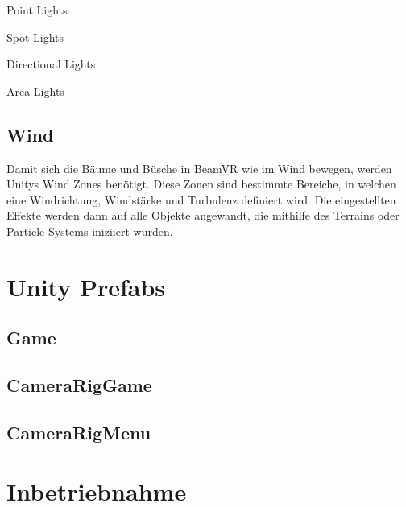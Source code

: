 Point Lights

Spot Lights

Directional Lights

Area Lights

\subsection{Wind}\label{subsec:wind-effect}
Damit sich die B\"aume und B\"usche in BeamVR wie im Wind bewegen, werden Unitys Wind Zones ben\"otigt.
Diese Zonen sind bestimmte Bereiche, in welchen eine Windrichtung, Windst\"arke und Turbulenz definiert wird.
Die eingestellten Effekte werden dann auf alle Objekte angewandt, die mithilfe des Terrains oder Particle Systems iniziiert wurden.
~\cite{Unity_WindZones_2022}

\section{Unity Prefabs}\label{sec:prefabs}
\subsection{Game}\label{subsec:game-prefab}
\subsection{CameraRigGame}\label{subsec:camera-rig-game-prefab}
\subsection{CameraRigMenu}\label{subsec:camera-rig-menu-prefab}
\section{Inbetriebnahme}\label{sec:commissioning}
